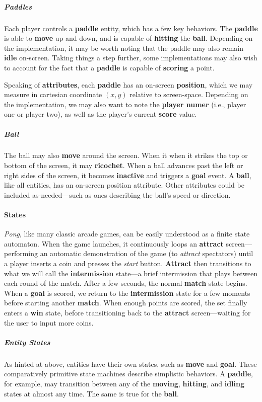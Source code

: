 \documentclass{report}
\newcommand{\state}[1]{\textbf{#1}}
\newcommand{\pad}{\textbf{paddle}\xspace}
\newcommand{\ball}{\textbf{ball}\xspace}
\begin{document}
\subparagraph{Paddles}

Each player controls a \pad entity, which has a few key behaviors. The \pad is able to \state{move} up and down, and is capable of \state{hitting} the \ball. Depending on the implementation, it may be worth noting that the paddle may also remain \state{idle} on-screen. Taking things a step further, some implementations may also wish to account for the fact that a \pad is capable of \state{scoring} a point. 

Speaking of \state{attributes}, each \pad has an on-screen \state{position}, which we may measure in cartesian coordinate $(x,y)$ relative to screen-space. Depending on the implementation, we may also want to note the \state{player numer} (i.e., player one or player two), as well as the player's current \state{score} value. 

\subparagraph{Ball} The ball may also \state{move} around the screen. When it when it strikes the top or bottom of the screen, it may \state{ricochet}. When a ball advances past the left or right sides of the screen, it becomes \state{inactive} and triggers a \state{goal} event.
A \ball, like all entities, has an on-screen position attribute. Other attributes could be included as-needed---such as ones describing the ball's speed or direction.


\paragraph{States} 

\emph{Pong}, like many classic arcade games, can be easily understood as a finite state automaton. When the game launches, it continuously loops an \state{attract} screen---performing an automatic demonstration of the game (to \emph{attract} spectators) until a player inserts a coin and presses the \emph{start} button. \state{Attract} then transitions to what we will call the \state{intermission} state---a brief intermission that plays between each round of the match. After a few seconds, the normal \state{match} state begins. When a \state{goal} is scored, we return to the \state{intermission} state for a few moments before starting another \state{match}. When enough points are scored, the set finally enters a \state{win} state, before transitioning back to the \state{attract} screen---waiting for the user to input more coins. 

\subparagraph{Entity States}
As hinted at above, entities have their own states, such as \state{move} and \state{goal}. These comparatively primitive state machines describe simplistic behaviors. A \pad, for example, may transition between any of the  \state{moving}, \state{hitting}, and \state{idling} states at almost any time. The same is true for the \ball.
\end{document}
